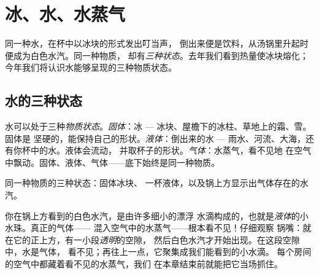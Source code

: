 \chapter{冰、水、水蒸气}\label{ch:g2:ice-water-steam}

同一种水，在杯中以冰块的形式发出叮当声，
倒出来便是饮料，从汤锅里升起时便成为白色水汽。同一种物质，
却有\emph{三种状态}。去年我们看到热量使冰块熔化；
今年我们将认识水能够呈现的三种物质状态。

\section{水的三种状态}

\begin{example}[各种状态出现在哪里]\label{ex:g2:ice-water-steam:where}
水可以处于三种\emph{物质状态}。\emph{固体}：冰 ---
冰块、屋檐下的冰柱、草地上的霜、雪。固体是
坚硬的，能保持自己的形状。\emph{液体}：倒出来的水 ---
雨水、河流、大海，还有你杯中的水。液体会流动，
并取杯子的形状。\emph{气体}：水蒸气，看不见地
在空气中飘动。固体、液体、气体——底下始终是同一种物质。
\end{example}

\begin{omfigure}

{\small 同一种物质的三种状态：固体冰块、
一杯液体，以及锅上方显示出气体存在的水汽。}
\end{omfigure}

\begin{remark}[水蒸气是看不见的]\label{rem:g2:ice-water-steam:invisible}
你在锅上方看到的白色水汽，是由许多细小的漂浮
水滴构成的，也就是\emph{液体}的小水珠。真正的气体——
混入空气中的水蒸气——根本看不见！仔细观察
锅嘴：就在它的正上方，有一小段\emph{透明}的空隙，
然后白色水汽才开始出现。在这段空隙中，水是气体，
看不见；再往上一点，它聚集成我们能看到的小水滴。
每个房间的空气中都藏着看不见的水蒸气，我们
在本章结束前就能把它当场抓住。
\end{remark}

